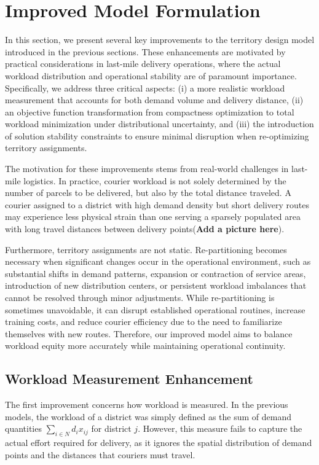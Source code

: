 \documentclass[preprint,12pt,authoryear]{elsarticle}
\begin{document}
\section{Improved Model Formulation}
\label{sec:improved}

In this section, we present several key improvements to the territory design model introduced in the previous sections. These enhancements are motivated by practical considerations in last-mile delivery operations, where the actual workload distribution and operational stability are of paramount importance. Specifically, we address three critical aspects: (i) a more realistic workload measurement that accounts for both demand volume and delivery distance, (ii) an objective function transformation from compactness optimization to total workload minimization under distributional uncertainty, and (iii) the introduction of solution stability constraints to ensure minimal disruption when re-optimizing territory assignments.

The motivation for these improvements stems from real-world challenges in last-mile logistics. In practice, courier workload is not solely determined by the number of parcels to be delivered, but also by the total distance traveled. A courier assigned to a district with high demand density but short delivery routes may experience less physical strain than one serving a sparsely populated area with long travel distances between delivery points(\textbf{Add a picture here}). 

Furthermore, territory assignments are not static. Re-partitioning becomes necessary when significant changes occur in the operational environment, such as substantial shifts in demand patterns, expansion or contraction of service areas, introduction of new distribution centers, or persistent workload imbalances that cannot be resolved through minor adjustments. While re-partitioning is sometimes unavoidable, it can disrupt established operational routines, increase training costs, and reduce courier efficiency due to the need to familiarize themselves with new routes. Therefore, our improved model aims to balance workload equity more accurately while maintaining operational continuity.

\subsection{Workload Measurement Enhancement}

The first improvement concerns how workload is measured. In the previous models, the workload of a district was simply defined as the sum of demand quantities $\sum_{i \in N} d_i x_{ij}$ for district $j$. However, this measure fails to capture the actual effort required for delivery, as it ignores the spatial distribution of demand points and the distances that couriers must travel.
\end{document}
